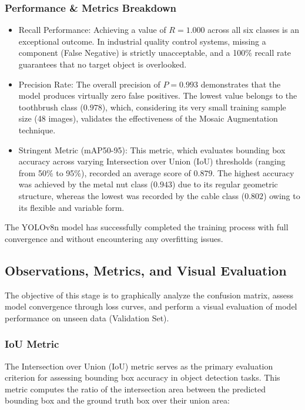 \documentclass{article}
\begin{document}
\subsubsection{Performance \& Metrics Breakdown}

\begin{itemize}
	\item Recall Performance: Achieving a value of $R = 1.000$ across all six classes is an exceptional outcome. In industrial quality control systems, missing a component (False Negative) is strictly unacceptable, and a 100\% recall rate guarantees that no target object is overlooked.
	\item Precision Rate: The overall precision of $P = 0.993$ demonstrates that the model produces virtually zero false positives. The lowest value belongs to the toothbrush class ($0.978$), which, considering its very small training sample size (48 images), validates the effectiveness of the Mosaic Augmentation technique.
	\item Stringent Metric (mAP50-95): This metric, which evaluates bounding box accuracy across varying Intersection over Union (IoU) thresholds (ranging from 50\% to 95\%), recorded an average score of $0.879$. The highest accuracy was achieved by the metal nut class ($0.943$) due to its regular geometric structure, whereas the lowest was recorded by the cable class ($0.802$) owing to its flexible and variable form.
\end{itemize}

The YOLOv8n model has successfully completed the training process with full convergence and without encountering any overfitting issues.

\subsection{Observations, Metrics, and Visual Evaluation}

The objective of this stage is to graphically analyze the confusion matrix, assess model convergence through loss curves, and perform a visual evaluation of model performance on unseen data (Validation Set).

\subsubsection{IoU Metric}

The Intersection over Union (IoU) metric serves as the primary evaluation criterion for assessing bounding box accuracy in object detection tasks. This metric computes the ratio of the intersection area between the predicted bounding box and the ground truth box over their union area:
\end{document}
